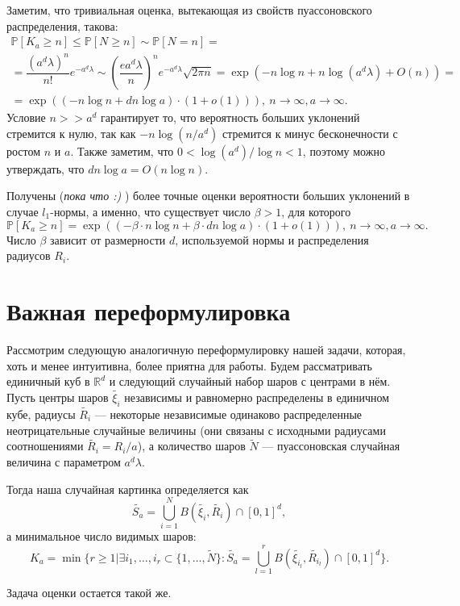 \documentclass[12pt]{article}
\theoremstyle{plain}
\theoremstyle{definition}
\theoremstyle{remark}
\def\geq{\geqslant}
\def\leq{\leqslant}
\newcommand{\cuplim}{\bigcup\limits}
\newcommand{\R}{\mathbb{R}}
\newcommand{\PP}{\mathbb{P}}
\newcommand{\til}{\widetilde}
\begin{document}
Заметим, что тривиальная оценка, вытекающая из свойств пуассоновского распределения, такова:
\begin{multline*}
    \PP[K_a \geq n] \leq \PP[N\geq n] \sim \PP[N = n] =\\
    = \dfrac{(a^d\lambda)^n}{n!}e^{-a^d\lambda} \sim \left(\dfrac{ea^d\lambda}{n}\right)^ne^{-a^d\lambda}\sqrt{2\pi n} = 
    \exp(-n\log n + n\log (a^d\lambda) + O(n) ) = \\
    =\exp((-n\log n + dn\log a)\cdot(1 + o(1))), \ n\to \infty, a \to\infty.
\end{multline*}{}
Условие $n>>a^d$ гарантирует то, что вероятность больших уклонений стремится к нулю, так как $-n\log(n/a^d)$ стремится к минус бесконечности с ростом $n$ и $a$.  Также заметим, что $0<\log(a^d)/\log n < 1$, поэтому можно утверждать, что $dn\log a = O(n\log n)$.

Получены ({\it пока что :)} ) более точные оценки вероятности больших уклонений в случае $l_1$-нормы, а именно, что существует число $\beta >1$, для которого $$\PP[K_a \geq n] = \exp((-\beta\cdot n\log n + \beta\cdot dn\log a)\cdot(1 + o(1))), \ n\to \infty, a \to\infty.$$
Число $\beta$ зависит от размерности $d$, используемой нормы и распределения радиусов $R_i$.



\section{Важная переформулировка}

Рассмотрим следующую аналогичную переформулировку нашей задачи, которая, хоть и менее интуитивна, более приятна для работы. Будем рассматривать единичный куб в $\R^d$ и следующий случайный набор шаров с центрами в нём. Пусть центры шаров $\til{\xi_i}$ независимы и равномерно распределены в единичном кубе, радиусы $\til{R_i}$ --- некоторые независимые одинаково распределенные неотрицательные случайные величины (они связаны с исходными радиусами соотношениями $\til{R_i} = R_i/a$), а количество шаров $\til{N}$ --- пуассоновская случайная величина с параметром $a^d\lambda$. 

Тогда наша случайная картинка определяется как $$\til{S_a} = \cuplim_{i=1}^N B(\til{\xi_i}, \til{R_i}) \cap [0,1]^d,$$ а минимальное число видимых шаров: $$K_a = \min \{r \geq 1 | \exists i_1, \ldots , i_r \subset \{1, \ldots , \til{N}\} : \til{S_a} = \cuplim_{l=1}^r B(\til{\xi_{i_l}}, \til{R_{i_l}}) \cap [0,1]^d\}.$$

Задача оценки остается такой же.
\end{document}

